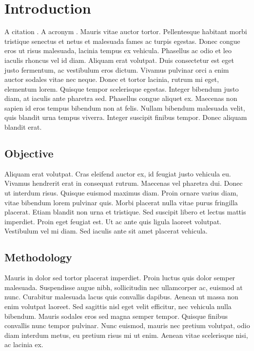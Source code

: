 \chapter{Introduction}

A citation \cite{paltirdge2002}. A acronym . Mauris vitae auctor tortor. Pellentesque habitant morbi tristique senectus et netus et malesuada fames ac turpis egestas. Donec congue eros ut risus malesuada, lacinia tempus ex vehicula. Phasellus ac odio et leo iaculis rhoncus vel id diam. Aliquam erat volutpat. Duis consectetur est eget justo fermentum, ac vestibulum eros dictum. Vivamus pulvinar orci a enim auctor sodales vitae nec neque. Donec et tortor lacinia, rutrum mi eget, elementum lorem. Quisque tempor scelerisque egestas. Integer bibendum justo diam, at iaculis ante pharetra sed. Phasellus congue aliquet ex. Maecenas non sapien id eros tempus bibendum non at felis. Nullam bibendum malesuada velit, quis blandit urna tempus viverra. Integer suscipit finibus tempor. Donec aliquam blandit erat.

\section{Objective}

Aliquam erat volutpat. Cras eleifend auctor ex, id feugiat justo vehicula eu. Vivamus hendrerit erat in consequat rutrum. Maecenas vel pharetra dui. Donec ut interdum risus. Quisque euismod maximus diam. Proin ornare varius diam, vitae bibendum lorem pulvinar quis. Morbi placerat nulla vitae purus fringilla placerat. Etiam blandit non urna et tristique. Sed suscipit libero et lectus mattis imperdiet. Proin eget feugiat est. Ut ac ante quis ligula laoreet volutpat. Vestibulum vel mi diam. Sed iaculis ante sit amet placerat vehicula.

\section{Methodology}

Mauris in dolor sed tortor placerat imperdiet. Proin luctus quis dolor semper malesuada. Suspendisse augue nibh, sollicitudin nec ullamcorper ac, euismod at nunc. Curabitur malesuada lacus quis convallis dapibus. Aenean ut massa non enim volutpat laoreet. Sed sagittis nisl eget velit efficitur, nec vehicula nulla bibendum. Mauris sodales eros sed magna semper tempor. Quisque finibus convallis nunc tempor pulvinar. Nunc euismod, mauris nec pretium volutpat, odio diam interdum metus, eu pretium risus mi ut enim. Aenean vitae scelerisque nisi, ac lacinia ex.

